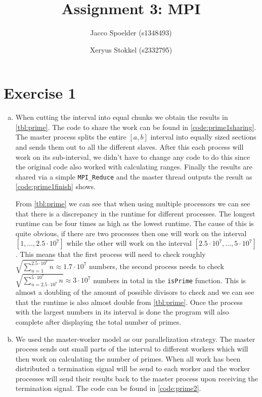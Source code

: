 \documentclass[a4paper]{article}
\title{Assignment 3: MPI}
\author{Jacco Spoelder (s1348493) \and Xeryus Stokkel (s2332795)}
\begin{document}
\maketitle

\section{Exercise 1}
\begin{enumerate}[(a)]
	\item When cutting the interval into equal chunks we obtain the results in \autoref{tbl:prime}. The code to share the work can be found in \autoref{code:prime1sharing}. The master process splits the entire $[a, b]$ interval into equally sized sections and sends them out to all the different slaves. After this each process will work on its sub-interval, we didn't have to change any code to do this since the original code also worked with calculating ranges. Finally the results are shared via a simple \texttt{MPI\_Reduce} and the master thread outputs the result as \autoref{code:prime1finish} shows.
	
	
	
	From \autoref{tbl:prime} we can see that when using multiple processors we can see that there is a discrepancy in the runtime for different processes. The longest runtime can be four times as high as the lowest runtime. The cause of this is quite obvious, if there are two processes then one will work on the interval $[1, \ldots, 2.5 \cdot 10^7]$ while the other will work on the interval $[2.5 \cdot 10^7, \ldots, 5 \cdot 10^7]$. This means that the first process will need to check roughly $\sqrt{\sum_{n=1}^{2.5 \cdot 10^7}n} \approx 1.7 \cdot 10^7$ numbers, the second process needs to check $\sqrt{\sum_{n=2.5\cdot 10^7}^{5\cdot 10^7}n} \approx 3 \cdot 10^7$ numbers in total in the \texttt{isPrime} function. This is almost a doubling of the amount of possible divisors to check and we can see that the runtime is also almost double from \autoref{tbl:prime}. Once the process with the largest numbers in its interval is done the program will also complete after displaying the total number of primes.
	
	\item We used the master-worker model as our parallelization strategy. The master process sends out small parts of the interval to different workers which will then work on calculating the number of primes. When all work has been distributed a termination signal will be send to each worker and the worker processes will send their results back to the master process upon receiving the termination signal. The code can be found in \autoref{code:prime2}.
	

\end{enumerate}
\end{document}
